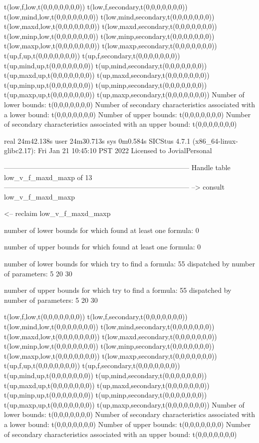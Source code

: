 t(low,f,low,t(0,0,0,0,0,0,0))
t(low,f,secondary,t(0,0,0,0,0,0,0))
t(low,mind,low,t(0,0,0,0,0,0,0))
t(low,mind,secondary,t(0,0,0,0,0,0,0))
t(low,maxd,low,t(0,0,0,0,0,0,0))
t(low,maxd,secondary,t(0,0,0,0,0,0,0))
t(low,minp,low,t(0,0,0,0,0,0,0))
t(low,minp,secondary,t(0,0,0,0,0,0,0))
t(low,maxp,low,t(0,0,0,0,0,0,0))
t(low,maxp,secondary,t(0,0,0,0,0,0,0))
t(up,f,up,t(0,0,0,0,0,0,0))
t(up,f,secondary,t(0,0,0,0,0,0,0))
t(up,mind,up,t(0,0,0,0,0,0,0))
t(up,mind,secondary,t(0,0,0,0,0,0,0))
t(up,maxd,up,t(0,0,0,0,0,0,0))
t(up,maxd,secondary,t(0,0,0,0,0,0,0))
t(up,minp,up,t(0,0,0,0,0,0,0))
t(up,minp,secondary,t(0,0,0,0,0,0,0))
t(up,maxp,up,t(0,0,0,0,0,0,0))
t(up,maxp,secondary,t(0,0,0,0,0,0,0))
Number of lower bounds:                                             t(0,0,0,0,0,0,0)
Number of secondary characteristics associated with a lower bound:  t(0,0,0,0,0,0,0)
Number of upper bounds:                                             t(0,0,0,0,0,0,0)
Number of secondary characteristics associated with an upper bound: t(0,0,0,0,0,0,0)

real	24m42.138s
user	24m30.713s
sys	0m0.584s
SICStus 4.7.1 (x86_64-linux-glibc2.17): Fri Jan 21 10:45:10 PST 2022
Licensed to JovialPersonal


--------------------------------------------------------------------------------
Handle table low_v_f_maxd_maxp of 13
--------------------------------------------------------------------------------
--> consult low_v_f_maxd_maxp

<-- reclaim low_v_f_maxd_maxp

number of lower bounds for which found at least one formula: 0

number of upper bounds for which found at least one formula: 0

number of lower bounds for which try to find a formula: 55
dispatched by number of parameters: 5  20  30

number of upper bounds for which try to find a formula: 55
dispatched by number of parameters: 5  20  30

t(low,f,low,t(0,0,0,0,0,0,0))
t(low,f,secondary,t(0,0,0,0,0,0,0))
t(low,mind,low,t(0,0,0,0,0,0,0))
t(low,mind,secondary,t(0,0,0,0,0,0,0))
t(low,maxd,low,t(0,0,0,0,0,0,0))
t(low,maxd,secondary,t(0,0,0,0,0,0,0))
t(low,minp,low,t(0,0,0,0,0,0,0))
t(low,minp,secondary,t(0,0,0,0,0,0,0))
t(low,maxp,low,t(0,0,0,0,0,0,0))
t(low,maxp,secondary,t(0,0,0,0,0,0,0))
t(up,f,up,t(0,0,0,0,0,0,0))
t(up,f,secondary,t(0,0,0,0,0,0,0))
t(up,mind,up,t(0,0,0,0,0,0,0))
t(up,mind,secondary,t(0,0,0,0,0,0,0))
t(up,maxd,up,t(0,0,0,0,0,0,0))
t(up,maxd,secondary,t(0,0,0,0,0,0,0))
t(up,minp,up,t(0,0,0,0,0,0,0))
t(up,minp,secondary,t(0,0,0,0,0,0,0))
t(up,maxp,up,t(0,0,0,0,0,0,0))
t(up,maxp,secondary,t(0,0,0,0,0,0,0))
Number of lower bounds:                                             t(0,0,0,0,0,0,0)
Number of secondary characteristics associated with a lower bound:  t(0,0,0,0,0,0,0)
Number of upper bounds:                                             t(0,0,0,0,0,0,0)
Number of secondary characteristics associated with an upper bound: t(0,0,0,0,0,0,0)

